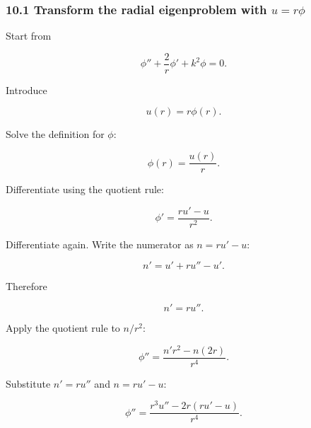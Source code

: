 \documentclass[11pt,a4paper]{article}
\begin{document}
\subsubsection*{10.1 Transform the radial eigenproblem with $u=r\phi$}

Start from

\begin{equation}
\phi''
+
\frac2r\phi'
+
k^2\phi
=
0.
\tag{TRISO-ANA-253}
\label{eq:triso-ana-253}
\end{equation}

Introduce

\begin{equation}
u(r)=r\phi(r).
\tag{TRISO-ANA-254}
\label{eq:triso-ana-254}
\end{equation}

Solve the definition for $\phi$:

\begin{equation}
\phi(r)=\frac{u(r)}{r}.
\tag{TRISO-ANA-255}
\label{eq:triso-ana-255}
\end{equation}

Differentiate using the quotient rule:

\begin{equation}
\phi'
=
\frac{r u'-u}{r^2}.
\tag{TRISO-ANA-256}
\label{eq:triso-ana-256}
\end{equation}

Differentiate again. Write the numerator as $n=ru'-u$:

\begin{equation}
n'=u'+ru''-u'.
\tag{TRISO-ANA-257}
\label{eq:triso-ana-257}
\end{equation}

Therefore

\begin{equation}
n'=ru''.
\tag{TRISO-ANA-258}
\label{eq:triso-ana-258}
\end{equation}

Apply the quotient rule to $n/r^2$:

\begin{equation}
\phi''
=
\frac{n'r^2-n(2r)}{r^4}.
\tag{TRISO-ANA-259}
\label{eq:triso-ana-259}
\end{equation}

Substitute $n'=ru''$ and $n=ru'-u$:

\begin{equation}
\phi''
=
\frac{r^3u''-2r(ru'-u)}{r^4}.
\tag{TRISO-ANA-260}
\label{eq:triso-ana-260}
\end{equation}
\end{document}

